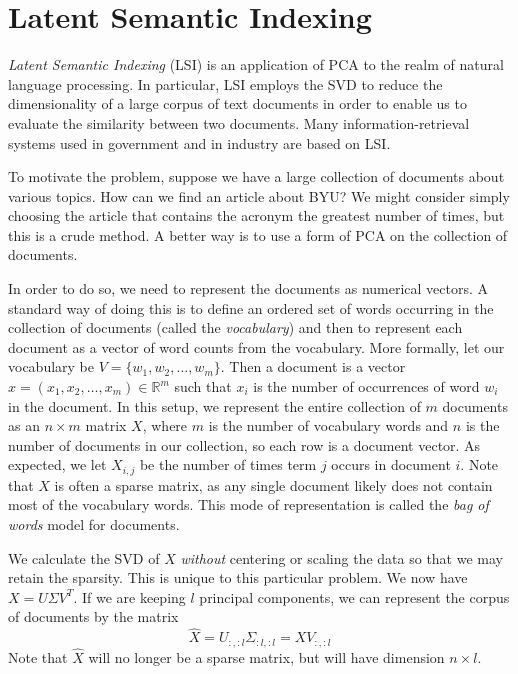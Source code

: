 \section*{Latent Semantic Indexing} %

\emph{Latent Semantic Indexing} (LSI) is an application of PCA to the realm of natural language processing.
In particular, LSI employs the SVD to reduce the dimensionality of a large corpus of text documents in order to enable us to evaluate the similarity between two documents.
Many information-retrieval systems used in government and in industry are based on LSI.

To motivate the problem, suppose we have a large collection of documents about various topics.
How can we find an article about BYU? %
We might consider simply choosing the article that contains the acronym the greatest number of times, but this is a crude method.
A better way is to use a form of PCA on the collection of documents.

In order to do so, we need to represent the documents as numerical vectors.
A standard way of doing this is to define an ordered set of words occurring in the collection of documents (called the \emph{vocabulary}) and then to represent each document as a vector of word counts from the vocabulary.
More formally, let our vocabulary be $V = \{w_1,w_2,\ldots,w_m\}$.
Then a document is a vector $x  = (x_1,x_2,\ldots,x_m) \in \mathbb{R}^m$ such that $x_i$ is the number of occurrences of word $w_i$ in the document.
In this setup, we represent the entire collection of $m$ documents as an $n \times m$ matrix $X$, where $m$ is the number of vocabulary words and $n$ is the number of documents in our collection, so each row is a document vector.
As expected, we let $X_{i,j}$ be the number of times term $j$ occurs in document $i$.
Note that $X$ is often a sparse matrix, as any single document likely does not contain most of the vocabulary words.
This mode of representation is called the \emph{bag of words} model for documents.

We calculate the SVD of $X$ \emph{without} centering or scaling the data so that we may retain the sparsity. 
This is unique to this particular problem.
We now have $X = U\Sigma V^T$.
If we are keeping $l$ principal components, we can represent the corpus of documents by the matrix
\[
\widehat{X} = U_{:,:l}\Sigma_{:l,:l} = XV_{:,:l}
\]
Note that $\widehat{X}$ will no longer be a sparse matrix, but will have dimension $n \times l$.

